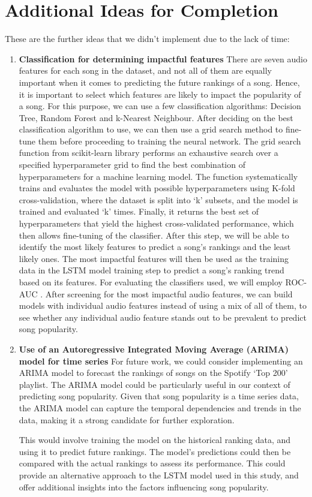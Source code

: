 \documentclass{article}
\begin{document}
\section{Additional Ideas for Completion}\label{E}

These are the further ideas that we didn't implement due to the lack of time:
\begin{enumerate}
    \item \textbf{Classification for determining impactful features}
\newline There are seven audio features for each song in the dataset, and not all of them are equally important when it comes to predicting the future rankings of a song. Hence, it is important to select which features are likely to impact the popularity of a song. For this purpose, we can use a few classification algorithms: Decision Tree, Random Forest and k-Nearest Neighbour. After deciding on the best classification algorithm to use, we can then use a grid search method to fine-tune them before proceeding to training the neural network. The grid search function from scikit-learn library \cite{scikit-learn} performs an exhaustive search over a specified hyperparameter grid to find the best combination of hyperparameters for a machine learning model. The function systematically trains and evaluates the model with possible hyperparameters using K-fold cross-validation, where the dataset is split into ‘k’ subsets, and the model is trained and evaluated ‘k’ times. Finally, it returns the best set of hyperparameters that yield the highest cross-validated performance, which then allows fine-tuning of the classifier. After this step, we will be able to identify the most likely features to predict a song’s rankings and the least likely ones. The most impactful features will then be used as the training data in the LSTM model training step to predict a song’s ranking trend based on its features. For evaluating the classifiers used, we will employ ROC-AUC \cite{ROC-AUC}.
After screening for the most impactful audio features, we can build models with individual audio features instead of using a mix of all of them, to see whether any individual audio feature stands out to be prevalent to predict song popularity. 
    \item \textbf{Use of an Autoregressive Integrated Moving Average (ARIMA) model for time series}
\newline For future work, we could consider implementing an ARIMA model \cite{ARIMA} to forecast the rankings of songs on the Spotify ‘Top 200’ playlist. The ARIMA model could be particularly useful in our context of predicting song popularity. Given that song popularity is a time series data, the ARIMA model can capture the temporal dependencies and trends in the data, making it a strong candidate for further exploration.

This would involve training the model on the historical ranking data, and using it to predict future rankings. The model’s predictions could then be compared with the actual rankings to assess its performance. This could provide an alternative approach to the LSTM model used in this study, and offer additional insights into the factors influencing song popularity.
\end{enumerate}
\end{document}
